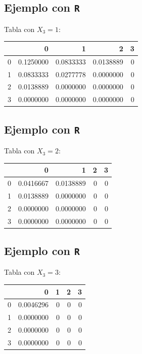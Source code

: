 \documentclass[]{book}
\begin{document}
\hypertarget{ejemplo-con-r-13}{%
\subsection{\texorpdfstring{Ejemplo con \texttt{R}}{Ejemplo con R}}\label{ejemplo-con-r-13}}

Tabla con \(X_3=1\):

\begin{tabular}{l|r|r|r|r}
\hline
  & 0 & 1 & 2 & 3\\
\hline
0 & 0.1250000 & 0.0833333 & 0.0138889 & 0\\
\hline
1 & 0.0833333 & 0.0277778 & 0.0000000 & 0\\
\hline
2 & 0.0138889 & 0.0000000 & 0.0000000 & 0\\
\hline
3 & 0.0000000 & 0.0000000 & 0.0000000 & 0\\
\hline
\end{tabular}

\hypertarget{ejemplo-con-r-14}{%
\subsection{\texorpdfstring{Ejemplo con \texttt{R}}{Ejemplo con R}}\label{ejemplo-con-r-14}}

Tabla con \(X_3=2\):

\begin{tabular}{l|r|r|r|r}
\hline
  & 0 & 1 & 2 & 3\\
\hline
0 & 0.0416667 & 0.0138889 & 0 & 0\\
\hline
1 & 0.0138889 & 0.0000000 & 0 & 0\\
\hline
2 & 0.0000000 & 0.0000000 & 0 & 0\\
\hline
3 & 0.0000000 & 0.0000000 & 0 & 0\\
\hline
\end{tabular}

\hypertarget{ejemplo-con-r-15}{%
\subsection{\texorpdfstring{Ejemplo con \texttt{R}}{Ejemplo con R}}\label{ejemplo-con-r-15}}

Tabla con \(X_3=3\):

\begin{tabular}{l|r|r|r|r}
\hline
  & 0 & 1 & 2 & 3\\
\hline
0 & 0.0046296 & 0 & 0 & 0\\
\hline
1 & 0.0000000 & 0 & 0 & 0\\
\hline
2 & 0.0000000 & 0 & 0 & 0\\
\hline
3 & 0.0000000 & 0 & 0 & 0\\
\hline
\end{tabular}
\end{document}
